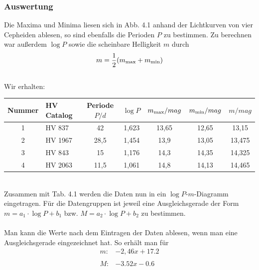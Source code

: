 \documentclass[12pt]{article}
\begin{document}
\subsubsection*{Auswertung}
Die Maxima und Minima liesen sich in Abb. 4.1 anhand der Lichtkurven von vier Cepheiden ablesen, so sind ebenfalls die Perioden $P$ zu bestimmen. Zu berechnen war außerdem $\log P$ sowie die scheinbare Helligkeit $m$ durch
\[m = \frac{1}{2}(m_{\textnormal{max}}+m_\textnormal{min})\]\\
Wir erhalten:
\begin{table}[!ht]
    \centering
    \begin{tabular}{c|l|c|c|c|c|c}
        Nummer & HV Catalog & Periode $P/d$ & $\log P$ & $m_{\textnormal{max}}/ mag$ &$m_{\textnormal{min}} / mag$ & $m / mag$ \\ \hline 
        1 & HV 837 & 42 & 1,623 & 13,65 & 12,65 & 13,15 \\ 
        2 & HV 1967 & 28,5 & 1,454 & 13,9 & 13,05 & 13,475 \\ 
        3 & HV 843 & 15 & 1,176 & 14,3 & 14,35 & 14,325 \\
        4 & HV 2063 & 11,5 & 1,061 & 14,8 & 14,13 & 14,465 \\
    \end{tabular}
\end{table}\\
Zusammen mit Tab. 4.1 werden die Daten nun in ein $\log P$-$m$-Diagramm eingetragen. Für die Datengruppen ist jeweil eine Ausgleichsgerade der Form $m=a_1 \cdot \log P + b_1$ bzw. $M=a_2 \cdot \log P + b_2$ zu bestimmen.\\\\
Man kann die Werte nach dem Eintragen der Daten ablesen, wenn man eine Ausgleichsgerade eingezeichnet hat. So erhält man für
\[\begin{aligned}
    m: &-2,46 x + 17.2\\\\
    M: & -3.52 x - 0.6
\end{aligned}\]
\newpage\noindent
%
\end{document}
